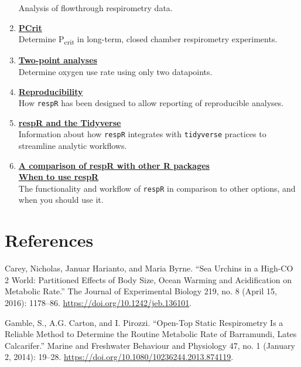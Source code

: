\documentclass[]{book}
\begin{document}
\begin{enumerate}
  Analysis of flowthrough respirometry data.
\item
  \textbf{\href{https://januarharianto.github.io/respR/articles/pcrit.html}{PCrit}}\\
  Determine P\textsubscript{crit} in long-term, closed chamber
  respirometry experiments.
\item
  \textbf{\href{https://januarharianto.github.io/respR/articles/twopoint.html}{Two-point
  analyses}}\\
  Determine oxygen use rate using only two datapoints.
\item
  \textbf{\href{https://januarharianto.github.io/respR/articles/reproducibility.html}{Reproducibility}}\\
  How \texttt{respR} has been designed to allow reporting of
  reproducible analyses.
\item
  \textbf{\href{https://januarharianto.github.io/respR/articles/tidyverse.html}{respR
  and the Tidyverse}}\\
  Information about how \texttt{respR} integrates with
  \texttt{tidyverse} practices to streamline analytic workflows.
\item
  \textbf{\href{https://januarharianto.github.io/respR/articles/packages_comp.html}{A
  comparison of respR with other R packages}}\\
  \textbf{\href{https://januarharianto.github.io/respR/articles/usage.html}{When
  to use respR}}\\
  The functionality and workflow of \texttt{respR} in comparison to
  other options, and when you should use it.
\end{enumerate}

\section{References}\label{references}

Carey, Nicholas, Januar Harianto, and Maria Byrne. ``Sea Urchins in a
High-CO 2 World: Partitioned Effects of Body Size, Ocean Warming and
Acidification on Metabolic Rate.'' The Journal of Experimental Biology
219, no. 8 (April 15, 2016): 1178--86.
\url{https://doi.org/10.1242/jeb.136101}.

Gamble, S., A.G. Carton, and I. Pirozzi. ``Open-Top Static Respirometry
Is a Reliable Method to Determine the Routine Metabolic Rate of
Barramundi, Lates Calcarifer.'' Marine and Freshwater Behaviour and
Physiology 47, no. 1 (January 2, 2014): 19--28.
\url{https://doi.org/10.1080/10236244.2013.874119}.
\end{document}
